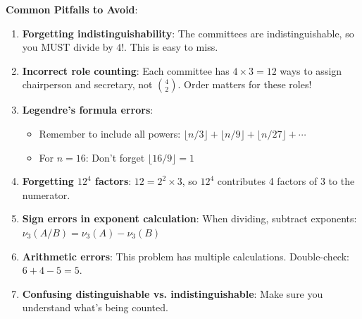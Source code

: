 \documentclass[12pt]{article}
\begin{document}
\begin{warningbox}
\textbf{Common Pitfalls to Avoid}:

\begin{enumerate}
    \item \textbf{Forgetting indistinguishability}: The committees are indistinguishable, so you MUST divide by $4!$. This is easy to miss.
    
    \item \textbf{Incorrect role counting}: Each committee has $4 \times 3 = 12$ ways to assign chairperson and secretary, not $\binom{4}{2}$. Order matters for these roles!
    
    \item \textbf{Legendre's formula errors}:
    \begin{itemize}
        \item Remember to include all powers: $\lfloor n/3 \rfloor + \lfloor n/9 \rfloor + \lfloor n/27 \rfloor + \cdots$
        \item For $n=16$: Don't forget $\lfloor 16/9 \rfloor = 1$
    \end{itemize}
    
    \item \textbf{Forgetting $12^4$ factors}: $12 = 2^2 \times 3$, so $12^4$ contributes 4 factors of 3 to the numerator.
    
    \item \textbf{Sign errors in exponent calculation}: When dividing, subtract exponents: $\nu_3(A/B) = \nu_3(A) - \nu_3(B)$
    
    \item \textbf{Arithmetic errors}: This problem has multiple calculations. Double-check: $6 + 4 - 5 = 5$.
    
    \item \textbf{Confusing distinguishable vs. indistinguishable}: Make sure you understand what's being counted.
\end{enumerate}
\end{warningbox}
\end{document}
